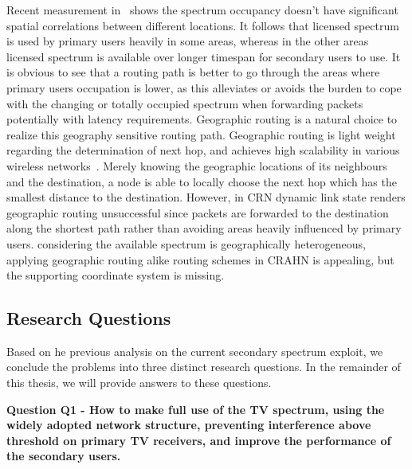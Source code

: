 Recent measurement in~\cite{measurement_Palaios14} shows the spectrum occupancy doesn't have significant spatial correlations between different locations.
It follows that licensed spectrum is used by primary users heavily in some areas, whereas in the other areas licensed spectrum is available over longer timespan for secondary users to use.
It is obvious to see that a routing path is better to go through the areas where primary users occupation is lower, as this alleviates or avoids the burden to cope with the changing or totally occupied spectrum when forwarding packets potentially with latency requirements.
Geographic routing is a natural choice to realize this geography sensitive routing path.
Geographic routing is light weight regarding the determination of next hop, and achieves high scalability in various wireless networks~\cite{geoRouing-qos-2009}. %
Merely knowing the geographic locations of its neighbours and the destination, a node is able to locally choose the next hop which has the smallest distance to the destination.
However, in CRN dynamic link state renders geographic routing unsuccessful since packets are forwarded to the destination along the shortest path rather than avoiding areas heavily influenced by primary users.
considering the available spectrum is geographically heterogeneous, applying geographic routing alike routing schemes in CRAHN is appealing, but the supporting coordinate system is missing.





\subsection{Research Questions}
Based on he previous analysis on the current secondary spectrum exploit, we conclude the problems into three distinct research questions.
In the remainder of this thesis, we will provide answers to these questions.

\textbf{Question Q1 - How to make full use of the TV spectrum, using the widely adopted network structure, preventing interference above threshold on primary TV receivers, and improve the performance of the secondary users.}

